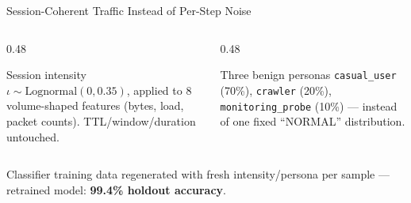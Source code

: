 \documentclass[aspectratio=169, 12pt]{beamer}
\begin{document}
\begin{frame}{Session-Coherent Traffic Instead of Per-Step Noise}
  \begin{center}
  \end{center}
  \vspace{0.3cm}
  \begin{columns}[T]
    \begin{column}{0.48\textwidth}
      \begin{block}{Session intensity}
        $\iota \sim \text{Lognormal}(0, 0.35)$, applied to 8
        volume-shaped features (bytes, load, packet counts).
        TTL/window/duration untouched.
      \end{block}
    \end{column}
    \begin{column}{0.48\textwidth}
      \begin{block}{Three benign personas}
        \texttt{casual\_user} (70\%), \texttt{crawler} (20\%),
        \texttt{monitoring\_probe} (10\%) --- instead of one fixed
        ``NORMAL'' distribution.
      \end{block}
    \end{column}
  \end{columns}
  \vspace{0.2cm}
  \begin{center}
    \textcolor{honeygrey}{\small Classifier training data regenerated with fresh
    intensity/persona per sample --- retrained model: \textbf{99.4\% holdout accuracy}.}
  \end{center}
\end{frame}
\end{document}
